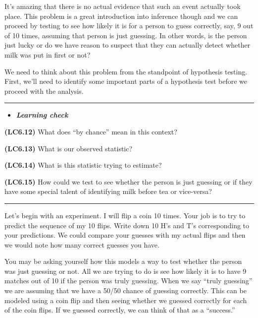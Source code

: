 \documentclass[]{tufte-book}
\let\oldrule=\rule
\renewcommand{\rule}[1]{\oldrule{\linewidth}}
\newenvironment{rmdblock}[1]
  {\begin{shaded*}
  \begin{itemize}
  \renewcommand{\labelitemi}{
    \raisebox{-.7\height}[0pt][0pt]{
    }
  }
  \item
  }
  {
  \end{itemize}
  \end{shaded*}
  }
\newenvironment{learncheck}
  {\begin{rmdblock}{warning}}
  {\end{rmdblock}}
\theoremstyle{definition}
\theoremstyle{definition}
\theoremstyle{remark}
\begin{document}
It's amazing that there is no actual evidence that such an event
actually took place. This problem is a great introduction into inference
though and we can proceed by testing to see how likely it is for a
person to guess correctly, say, 9 out of 10 times, assuming that person
is just guessing. In other words, is the person just lucky or do we have
reason to suspect that they can actually detect whether milk was put in
first or not?

We need to think about this problem from the standpoint of hypothesis
testing. First, we'll need to identify some important parts of a
hypothesis test before we proceed with the analysis.

\begin{center}\rule{0.5\linewidth}{\linethickness}\end{center}

\begin{learncheck}
\textbf{\emph{Learning check}}
\end{learncheck}

\textbf{(LC6.12)} What does ``by chance'' mean in this context?

\textbf{(LC6.13)} What is our observed statistic?

\textbf{(LC6.14)} What is this statistic trying to estimate?

\textbf{(LC6.15)} How could we test to see whether the person is just
guessing or if they have some special talent of identifying milk before
tea or vice-versa?

\begin{center}\rule{0.5\linewidth}{\linethickness}\end{center}

Let's begin with an experiment. I will flip a coin 10 times. Your job is
to try to predict the sequence of my 10 flips. Write down 10 H's and T's
corresponding to your predictions. We could compare your guesses with my
actual flips and then we would note how many correct guesses you have.

You may be asking yourself how this models a way to test whether the
person was just guessing or not. All we are trying to do is see how
likely it is to have 9 matches out of 10 if the person was truly
guessing. When we say ``truly guessing'' we are assuming that we have a
50/50 chance of guessing correctly. This can be modeled using a coin
flip and then seeing whether we guessed correctly for each of the coin
flips. If we guessed correctly, we can think of that as a ``success.''
\end{document}
